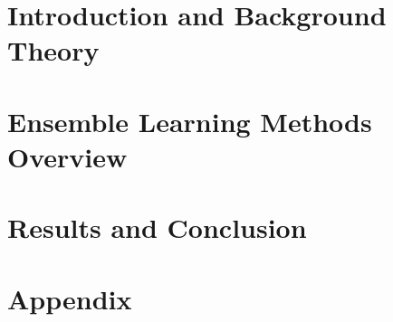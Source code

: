 
\addtolength{\evensidemargin}{-12mm}

%
%
\part[Introduction and Background Theory]{Introduction and Background Theory}
\label{part:introAndBackgroundTheory}

 

\part[Ensemble Learning Methods Overview]{Ensemble Learning Methods Overview}
\label{part:ensembleLearningMethods}





\part[Results and Conclusion]{Results and Conclusion}
\label{part:resultsAndConclusion}
 
 
 

%
%

\part*{Appendix}

\appendix



